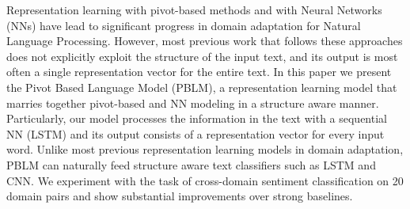 Representation learning with pivot-based methods and with Neural Networks (NNs) have lead to significant progress in domain adaptation for Natural Language Processing. However, most previous work that follows these approaches does not explicitly exploit the structure of the input text, and its output is most often a single representation vector for the entire text. In this paper we present the Pivot Based Language Model (PBLM), a representation learning model that marries together pivot-based and NN modeling in a structure aware manner. Particularly, our model processes the information in the text with a sequential NN (LSTM) and its output consists of a representation vector for every input word. Unlike most previous representation learning models in domain adaptation, PBLM can naturally feed structure aware text classifiers such as LSTM and CNN. We experiment with the task of cross-domain sentiment classification on 20 domain pairs and show substantial improvements over strong baselines.
